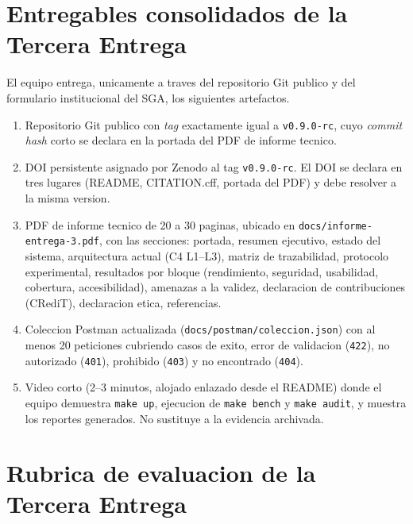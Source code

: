 \documentclass[11pt,a4paper]{article}
\begin{document}
\section{Entregables consolidados de la Tercera Entrega}

El equipo entrega, unicamente a traves del repositorio Git publico y del formulario institucional del SGA, los siguientes artefactos.

\begin{enumerate}
    \item Repositorio Git publico con \emph{tag} exactamente igual a \texttt{v0.9.0-rc}, cuyo \emph{commit hash} corto se declara en la portada del PDF de informe tecnico.
    \item DOI persistente asignado por Zenodo al tag \texttt{v0.9.0-rc}. El DOI se declara en tres lugares (README, CITATION.cff, portada del PDF) y debe resolver a la misma version.
    \item PDF de informe tecnico de 20 a 30 paginas, ubicado en \texttt{docs/informe-entrega-3.pdf}, con las secciones: portada, resumen ejecutivo, estado del sistema, arquitectura actual (C4 L1--L3), matriz de trazabilidad, protocolo experimental, resultados por bloque (rendimiento, seguridad, usabilidad, cobertura, accesibilidad), amenazas a la validez, declaracion de contribuciones (CRediT), declaracion etica, referencias.
    \item Coleccion Postman actualizada (\texttt{docs/postman/coleccion.json}) con al menos 20 peticiones cubriendo casos de exito, error de validacion (\texttt{422}), no autorizado (\texttt{401}), prohibido (\texttt{403}) y no encontrado (\texttt{404}).
    \item Video corto (2--3 minutos, alojado enlazado desde el README) donde el equipo demuestra \texttt{make up}, ejecucion de \texttt{make bench} y \texttt{make audit}, y muestra los reportes generados. No sustituye a la evidencia archivada.
\end{enumerate}

\section{Rubrica de evaluacion de la Tercera Entrega}
\end{document}
